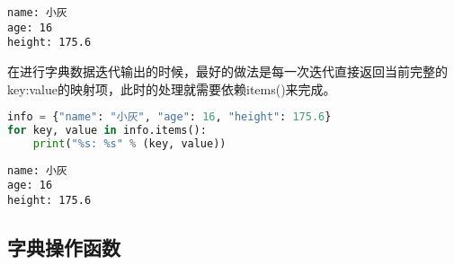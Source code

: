 \begin{tcolorbox}
	\begin{verbatim}
name: 小灰
age: 16
height: 175.6
\end{verbatim}
\end{tcolorbox}

在进行字典数据迭代输出的时候，最好的做法是每一次迭代直接返回当前完整的key:value的映射项，此时的处理就需要依赖items()来完成。\\


\begin{lstlisting}[language=Python]
info = {"name": "小灰", "age": 16, "height": 175.6}
for key, value in info.items():
    print("%s: %s" % (key, value))
\end{lstlisting}

\begin{tcolorbox}
	\begin{verbatim}
name: 小灰
age: 16
height: 175.6
\end{verbatim}
\end{tcolorbox}

\vspace{0.5cm}

\subsection{字典操作函数}

\begin{table}[H]
	\centering
	\caption{字典操作函数}
\end{table}

